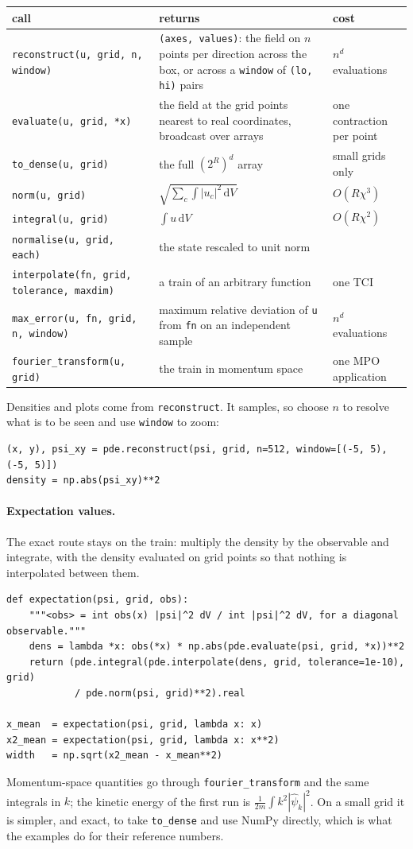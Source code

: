 \documentclass[11pt,a4paper]{article}
\newcommand{\code}[1]{\texttt{#1}}
\newcommand{\dd}{\mathrm{d}}
\begin{document}
\begin{tabularx}{\textwidth}{@{}lLl@{}}
\toprule
call & returns & cost \\
\midrule
\code{reconstruct(u, grid, n, window)} & \code{(axes, values)}: the field on $n$ points
per direction across the box, or across a \code{window} of \code{(lo, hi)} pairs &
$n^d$ evaluations \\
\code{evaluate(u, grid, *x)} & the field at the grid points nearest to real coordinates,
broadcast over arrays & one contraction per point \\
\code{to\_dense(u, grid)} & the full $(2^R)^d$ array & small grids only \\
\code{norm(u, grid)} & $\sqrt{\sum_c\int|u_c|^2\,\dd V}$ & $O(R\chi^3)$ \\
\code{integral(u, grid)} & $\int u\,\dd V$ & $O(R\chi^2)$ \\
\code{normalise(u, grid, each)} & the state rescaled to unit norm & \\
\code{interpolate(fn, grid, tolerance, maxdim)} & a train of an arbitrary function & one TCI \\
\code{max\_error(u, fn, grid, n, window)} & maximum relative deviation of \code{u} from
\code{fn} on an independent sample & $n^d$ evaluations \\
\code{fourier\_transform(u, grid)} & the train in momentum space & one MPO application \\
\bottomrule
\end{tabularx}

Densities and plots come from \code{reconstruct}. It samples, so choose $n$ to resolve
what is to be seen and use \code{window} to zoom:
\begin{lstlisting}
(x, y), psi_xy = pde.reconstruct(psi, grid, n=512, window=[(-5, 5), (-5, 5)])
density = np.abs(psi_xy)**2
\end{lstlisting}

\paragraph{Expectation values.} The exact route stays on the train: multiply the
density by the observable and integrate, with the density evaluated on grid points so
that nothing is interpolated between them.
\begin{lstlisting}
def expectation(psi, grid, obs):
    """<obs> = int obs(x) |psi|^2 dV / int |psi|^2 dV, for a diagonal observable."""
    dens = lambda *x: obs(*x) * np.abs(pde.evaluate(psi, grid, *x))**2
    return (pde.integral(pde.interpolate(dens, grid, tolerance=1e-10), grid)
            / pde.norm(psi, grid)**2).real

x_mean  = expectation(psi, grid, lambda x: x)
x2_mean = expectation(psi, grid, lambda x: x**2)
width   = np.sqrt(x2_mean - x_mean**2)
\end{lstlisting}
Momentum-space quantities go through \code{fourier\_transform} and the same integrals
in $k$; the kinetic energy of the first run is $\frac{1}{2m}\int k^2|\hat\psi_k|^2$. On
a small grid it is simpler, and exact, to take \code{to\_dense} and use NumPy directly,
which is what the examples do for their reference numbers.
\end{document}
